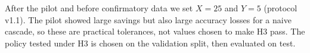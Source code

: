 After the pilot and before confirmatory data we set $X=25$ and $Y=5$ (protocol v1.1). The pilot showed large savings but also large accuracy losses for a naive cascade, so these are practical tolerances, not values chosen to make H3 pass. The policy tested under H3 is chosen on the validation split, then evaluated on test.
